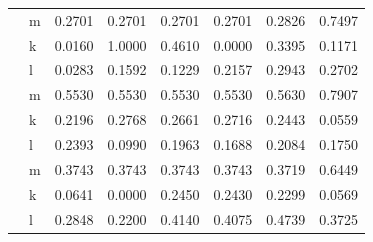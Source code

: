 \documentclass[
  12pt]{article}
\theoremstyle{definition}
\theoremstyle{remark}
\begin{document}
\begin{table}
{\begin{tabular}[t]{l|l|r|r|r|r|r|r}
\cline{1-8}
 & m & 0.2701 & 0.2701 & 0.2701 & 0.2701 & 0.2826 & 0.7497\\
\cline{2-8}
 & k & 0.0160 & 1.0000 & 0.4610 & 0.0000 & 0.3395 & 0.1171\\
\cline{2-8}
\multirow[t]{-3}{*}{\raggedright\arraybackslash 313} & l & 0.0283 & 0.1592 & 0.1229 & 0.2157 & 0.2943 & 0.2702\\
\cline{1-8}
 & m & 0.5530 & 0.5530 & 0.5530 & 0.5530 & 0.5630 & 0.7907\\
\cline{2-8}
 & k & 0.2196 & 0.2768 & 0.2661 & 0.2716 & 0.2443 & 0.0559\\
\cline{2-8}
\multirow[t]{-3}{*}{\raggedright\arraybackslash 311} & l & 0.2393 & 0.0990 & 0.1963 & 0.1688 & 0.2084 & 0.1750\\
\cline{1-8}
 & m & 0.3743 & 0.3743 & 0.3743 & 0.3743 & 0.3719 & 0.6449\\
\cline{2-8}
 & k & 0.0641 & 0.0000 & 0.2450 & 0.2430 & 0.2299 & 0.0569\\
\cline{2-8}
\multirow[t]{-3}{*}{\raggedright\arraybackslash 381} & l & 0.2848 & 0.2200 & 0.4140 & 0.4075 & 0.4739 & 0.3725\\
\hline
\end{tabular}

}

\end{table}%
\end{document}
